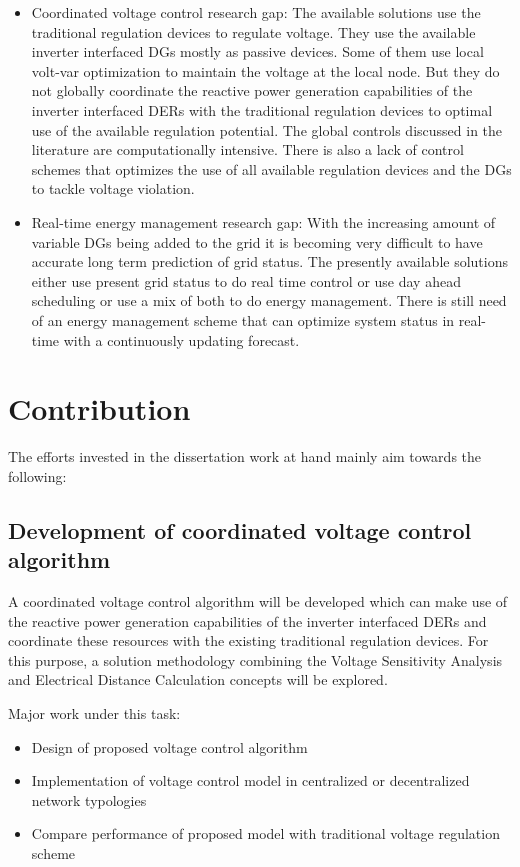 \begin{itemize}
    \item Coordinated voltage control research gap: The available solutions use the traditional regulation devices to regulate voltage. They use the available inverter interfaced DGs mostly as passive devices. Some of them use local volt-var optimization to maintain the voltage at the local node. But they do not globally coordinate the reactive power generation capabilities of the inverter interfaced DERs with the traditional regulation devices to optimal use of the available regulation potential. The global controls discussed in the literature are computationally intensive. There is also a lack of control schemes that optimizes the use of all available regulation devices and the DGs to tackle voltage violation.
    
    \item Real-time energy management research gap: With the increasing amount of variable DGs being added to the grid it is becoming very difficult to have accurate long term prediction of grid status. The presently available solutions either use present grid status to do real time control or use day ahead scheduling or use a mix of both to do energy management. There is still need of an energy management scheme that can optimize system status in real-time with a continuously updating forecast. 
\end{itemize}

\section{Contribution}
The efforts invested in the dissertation work at hand mainly aim towards the following:
 
\subsection{Development of coordinated voltage control algorithm}
A coordinated voltage control algorithm will be developed which can make use of the reactive power generation capabilities of the inverter interfaced DERs and coordinate these resources with the existing traditional regulation devices. For this purpose, a solution methodology combining the Voltage Sensitivity Analysis \cite{Th_ali} and Electrical Distance Calculation \cite{Alvi3} concepts will be explored.

Major work under this task:
\begin{itemize}
    \item Design of proposed voltage control algorithm 
    \item Implementation of voltage control model in centralized or decentralized network typologies
    \item Compare performance of proposed model with traditional voltage regulation scheme
\end{itemize}

